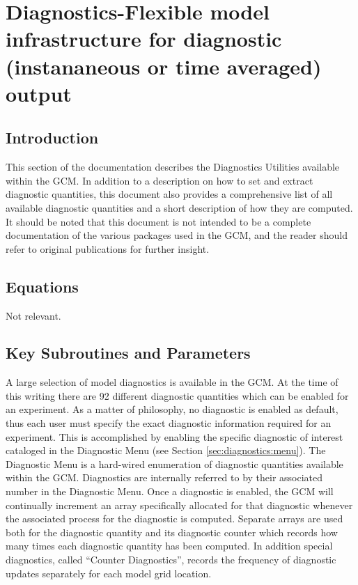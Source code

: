 \section{Diagnostics-Flexible model infrastructure for diagnostic (instananeous or time averaged) output}

\subsection{Introduction}

This section of the documentation describes the Diagnostics Utilities available within the GCM.  
In addition to
a description on how to set and extract diagnostic quantities, this document also provides a
comprehensive list of all available diagnostic quantities and a short description of how they are
computed.  It should be noted that this document is not intended to be a complete documentation
of the various packages used in the GCM, and the reader should
refer to original publications for further insight.


\subsection{Equations}
Not relevant.

\subsection{Key Subroutines and Parameters}
\label{sec:diagnostics:diagover}

A large selection of model diagnostics is available in the GCM.  At the time of
this writing there are 92 different diagnostic quantities which can be enabled for an
experiment.  As a matter of philosophy, no diagnostic is enabled as default, thus each user must
specify the exact diagnostic information required for an experiment.  This is accomplished by
enabling the specific diagnostic of interest cataloged in the 
Diagnostic Menu (see Section \ref{sec:diagnostics:menu}).
The Diagnostic Menu is a hard-wired enumeration of diagnostic quantities available within the
GCM.  Diagnostics are internally referred to by their associated number in the Diagnostic
Menu.  Once a diagnostic is enabled, the GCM will continually increment an array
specifically allocated for that diagnostic whenever the associated process for the diagnostic is
computed.  Separate arrays are used both for the diagnostic quantity and its diagnostic counter
which records how many times each diagnostic quantity has been computed.  In addition 
special diagnostics, called
``Counter Diagnostics'', records the frequency of diagnostic updates separately for each 
model grid location.

